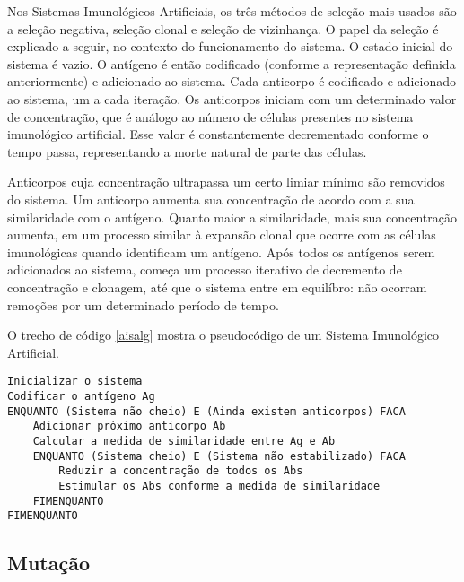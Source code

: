 Nos Sistemas Imunológicos Artificiais, os três métodos de seleção mais usados são a seleção negativa, seleção clonal e seleção de vizinhança. O papel da seleção é explicado a seguir, no contexto do funcionamento do sistema. O estado inicial do sistema é vazio. O antígeno é então codificado (conforme a representação definida anteriormente) e adicionado ao sistema. Cada anticorpo é codificado e adicionado ao sistema, um a cada iteração. Os anticorpos iniciam com um determinado valor de concentração, que é análogo ao número de células presentes no sistema imunológico artificial. Esse valor é constantemente decrementado conforme o tempo passa, representando a morte natural de parte das células.

Anticorpos cuja concentração ultrapassa um certo limiar mínimo são removidos do sistema. Um anticorpo aumenta sua concentração de acordo com a sua similaridade com o antígeno. Quanto maior a similaridade, mais sua concentração aumenta, em um processo similar à expansão clonal que ocorre com as células imunológicas quando identificam um antígeno. Após todos os antígenos serem adicionados ao sistema, começa um processo iterativo de decremento de concentração e clonagem, até que o sistema entre em equilíbro: não ocorram remoções por um determinado período de tempo.

O trecho de código \ref{aisalg} mostra o pseudocódigo de um Sistema Imunológico Artificial.

\begin{lstlisting}[caption=Pseudo código de um Sistema Imunológico Artificial,label=aisalg]
Inicializar o sistema
Codificar o antígeno Ag
ENQUANTO (Sistema não cheio) E (Ainda existem anticorpos) FACA
    Adicionar próximo anticorpo Ab
    Calcular a medida de similaridade entre Ag e Ab
    ENQUANTO (Sistema cheio) E (Sistema não estabilizado) FACA
        Reduzir a concentração de todos os Abs
        Estimular os Abs conforme a medida de similaridade
    FIMENQUANTO
FIMENQUANTO
\end{lstlisting}


\subsection{Mutação}

